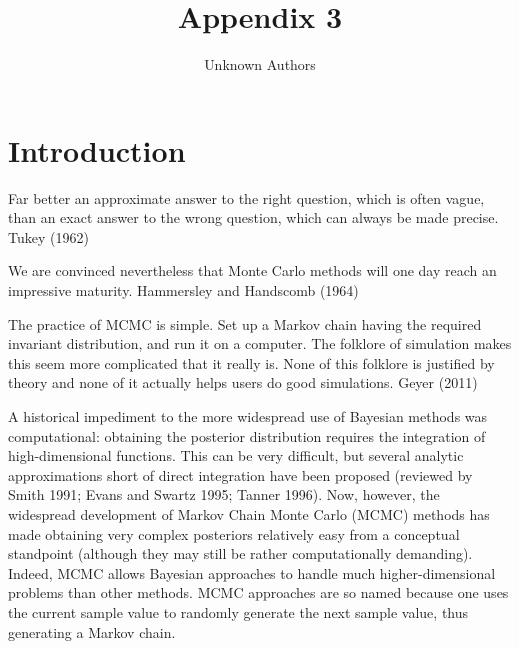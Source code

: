 \documentclass{article}
\title{Appendix 3}
\author{Unknown Authors}
\date{}
\begin{document}
\maketitle

\begin{abstract}

\end{abstract}

\section{Introduction}
Far better an approximate answer to the right question, which is often vague, than an exact answer to the wrong question, which can always be made precise. Tukey (1962)

We are convinced nevertheless that Monte Carlo methods will one day reach an impressive maturity. Hammersley and Handscomb (1964)

The practice of MCMC is simple. Set up a Markov chain having the required invariant distribution, and run it on a computer. The folklore of simulation makes this seem more complicated that it really is. None of this folklore is justified by theory and none of it actually helps users do good simulations. Geyer (2011)

A historical impediment to the more widespread use of Bayesian methods was computational: obtaining the posterior distribution requires the integration of high-dimensional functions. This can be very difficult, but several analytic approximations short of direct integration have been proposed (reviewed by Smith 1991; Evans and Swartz 1995; Tanner 1996). Now, however, the widespread development of Markov Chain Monte Carlo (MCMC) methods has made obtaining very complex posteriors relatively easy from a conceptual standpoint (although they may still be rather computationally demanding). Indeed, MCMC allows Bayesian approaches to handle much higher-dimensional problems than other methods. MCMC approaches are so named because one uses the current sample value to randomly generate the next sample value, thus generating a Markov chain.
\end{document}
